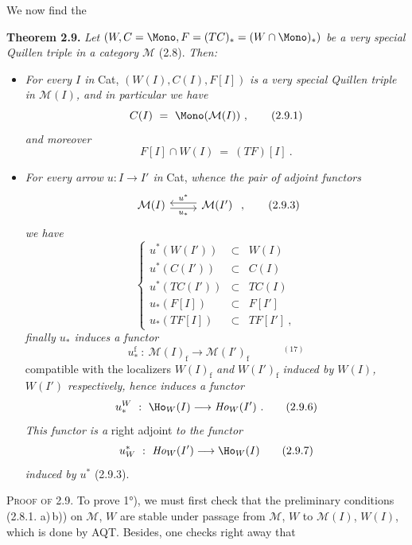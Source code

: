 We now find the

\textbf{Theorem 2.9.} \textit{Let} $(W, C = \Mono, F = (TC)_* = (W\cap\Mono)_*)$ \textit{be a very special Quillen triple in a category $\mathcal{M}$} (2.8). \textit{Then:}
\begin{itemize}[leftmargin=2.5em]
\item[1°)] \textit{For every $I$ in} Cat, $(W(I),C(I),F[I])$ \textit{is a very special Quillen triple in $\mathcal{M}(I)$, and in particular we have}
\[ C(I) \ = \ \Mono(\mathcal{M}(I))\ , \tag*{(2.9.1)} \]
\textit{and moreover}
\[ F[I]\cap W(I) \ = \ (TF)[I]\ . \tag*{(2.9.2)} \]
\item[2°)] \textit{For every arrow $u : I \longrightarrow I'$ in} Cat, \textit{whence the pair of adjoint functors}
\[ \begin{tikzcd}
\mathcal{M}(I) \arrow[r, shift right, "u_*"'] & \mathcal{M}(I') \arrow[l, shift right, "u^*"']
\end{tikzcd}\ , \tag*{(2.9.3)} \]
\textit{we have}
\[ \left\{ \begin{array}{rcl}
u^*(W(I')) & \subset & W(I)\\
u^*(C(I')) & \subset & C(I)\\
u^*(TC(I')) & \subset & TC(I)\\
u_*(F[I]) & \subset & F[I']\\
u_*(TF[I]) & \subset & TF[I']\ ,
\end{array}\right. \tag*{(2.9.4)} \]
\textit{finally $u_*$ induces a functor}
\[ u_*^{\mathrm{f}} \ :\ \mathcal{M}(I)_{\mathrm{f}} \longrightarrow \mathcal{M}(I')_{\mathrm{f}} \qquad\quad ^{(17)} \tag*{(2.9.5)} \]
compatible with the localizers $W(I)_{\mathrm{f}}$ \textit{and} $W(I')_{\mathrm{f}}$ \textit{induced by $W(I)$, $W(I')$ respectively, hence induces a functor}
\[ u_*^W \ :\ \Ho_W(I) \longrightarrow \mathit{Ho}_W(I')\ . \tag*{(2.9.6)} \] %
\textit{This functor is a} right adjoint \textit{to the functor}
\[ u_W^* \ :\ \mathit{Ho}_W(I') \longrightarrow \Ho_W(I) \tag*{(2.9.7)} \] %
\textit{induced by $u^*$} (2.9.3).
\end{itemize}
\textsc{Proof of 2.9.} To prove 1°), we must first check that the preliminary conditions (2.8.1. a)\,b)) on $\mathcal{M}$, $W$ are stable under passage from $\mathcal{M}$, $W$ to $\mathcal{M}(I)$, $W(I)$, which is done by AQT. Besides, one checks right away that
